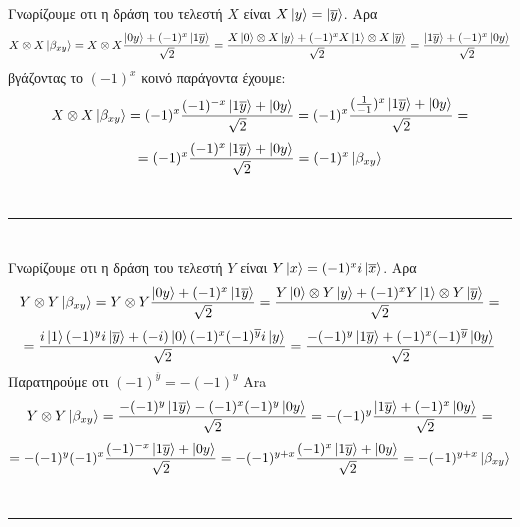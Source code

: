 \documentclass[12pt]{article}
\begin{document}
\section*{{}}
Γνωρίζουμε οτι η δράση του  τελεστή $X$ είναι $X\ket{y} = \ket{\overline{y}} $. Αρα
$$X\otimes X\ket{\beta_{xy}} =  X\otimes X\frac{\ket{0y} +(-1)^x\ket{1\overline{y}}}{\sqrt{2}} =\frac{X\ket{0}\otimes X\ket{y} +(-1)^xX\ket{1}\otimes X\ket{\overline{y}}}{\sqrt{2}} 
=\frac{\ket{1\overline{y}} +(-1)^x\ket{0y}}{\sqrt{2}}$$
βγάζοντας το $(-1)^x$ κοινό παράγοντα έχουμε:
$$X\otimes X\ket{\beta_{xy}} = (-1)^x\frac{(-1)^{-x}\ket{1\overline{y}} +\ket{0y}}{\sqrt{2}}=(-1)^x\frac{(\frac{1}{-1})^{x}\ket{1\overline{y}} +\ket{0y}}{\sqrt{2}}=$$
$$=(-1)^x\frac{(-1)^{x}\ket{1\overline{y}} +\ket{0y}}{\sqrt{2}} = (-1)^x\ket{\beta_{xy}}$$\\
\rule{\textwidth}{.5pt}
\section*{{}}
Γνωρίζουμε οτι η δράση του  τελεστή $Y$ είναι $Y\ket{x} = (-1)^xi\ket{\overline{x}} $. Αρα
$$Y\otimes Y\ket{\beta_{xy}} =  Y\otimes Y\frac{\ket{0y} +(-1)^x\ket{1\overline{y}}}{\sqrt{2}} =\frac{Y\ket{0}\otimes Y\ket{y} +(-1)^xY\ket{1}\otimes Y\ket{\overline{y}}}{\sqrt{2}} =$$
$$=\frac{i\ket{1}(-1)^yi\ket{\overline{y}} +(-i)\ket{0}(-1)^x(-1)^{\overline{y}}i\ket{y}}{\sqrt{2}}
=\frac{-(-1)^y\ket{1\overline{y}} +(-1)^x(-1)^{\overline{y}}\ket{0y}}{\sqrt{2}}$$
Παρατηρούμε οτι $(-1)^{\overline{y}} = -(-1)^y $ Ara
$$Y\otimes Y\ket{\beta_{xy}} = \frac{-(-1)^y\ket{1\overline{y}} -(-1)^x(-1)^{y}\ket{0y}}{\sqrt{2}}=-(-1)^y\frac{\ket{1\overline{y}} +(-1)^x\ket{0y}}{\sqrt{2}} =$$
$$=-(-1)^y(-1)^x\frac{(-1)^{-x}\ket{1\overline{y}} +\ket{0y}}{\sqrt{2}} =- (-1)^{y+x}\frac{(-1)^{x}\ket{1\overline{y}} +\ket{0y}}{\sqrt{2}}= - (-1)^{y+x}\ket{\beta_{xy}}$$\\
\rule{\textwidth}{.5pt}
\end{document}
